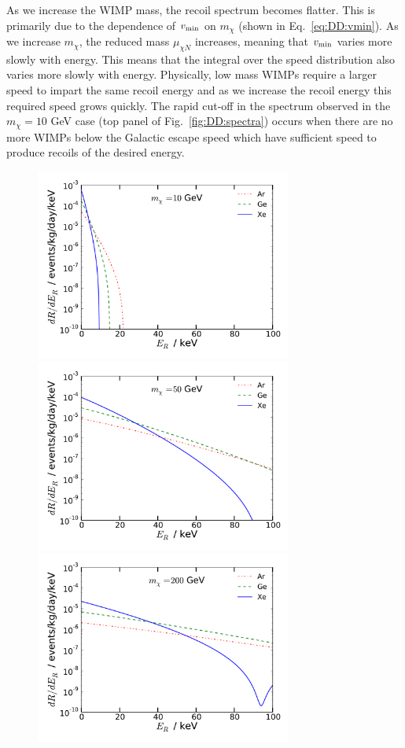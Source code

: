 As we increase the WIMP mass, the recoil spectrum becomes flatter. This is primarily due to the dependence of $\vmin$ on $m_\chi$ (shown in Eq.~\ref{eq:DD:vmin}). As we increase $m_\chi$, the reduced mass $\mu_{\chi N}$ increases, meaning that $\vmin$ varies more slowly with energy. This means that the integral over the speed distribution also varies more slowly with energy. Physically, low mass WIMPs require a larger speed to impart the same recoil energy and as we increase the recoil energy this required speed grows quickly. The rapid cut-off in the spectrum observed in the $m_\chi = 10$ GeV case (top panel of Fig.~\ref{fig:DD:spectra}) occurs when there are no more WIMPs below the Galactic escape speed which have sufficient speed to produce recoils of the desired energy.

\begin{figure}[p]
\centering
  \includegraphics[width=0.75\textwidth]{DirectDetection/Spectra_10GeV.pdf}
  \includegraphics[width=0.75\textwidth]{DirectDetection/Spectra_50GeV.pdf}
  \includegraphics[width=0.75\textwidth]{DirectDetection/Spectra_200GeV.pdf}

\end{figure}
